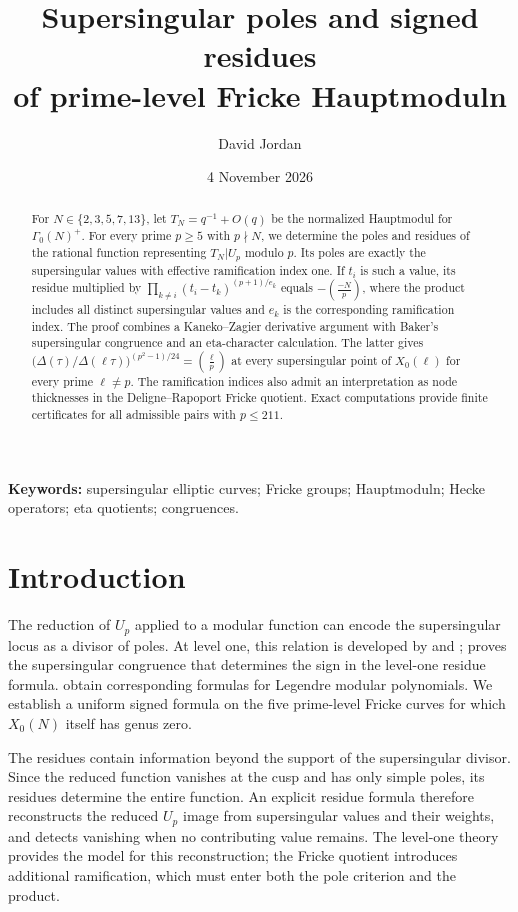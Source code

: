 \documentclass[11pt,a4paper]{article}
\title{Supersingular poles and signed residues\\of prime-level Fricke Hauptmoduln}
\author{David Jordan}
\date{4 November 2026}
\numberwithin{equation}{section}
\theoremstyle{definition}
\theoremstyle{remark}
\begin{document}
\maketitle
\begin{abstract}
For $N\in\{2,3,5,7,13\}$, let $T_N=q^{-1}+O(q)$ be the normalized Hauptmodul for
$\Gamma_0(N)^+$. For every prime $p\ge5$ with $p\nmid N$, we determine the poles and
residues of the rational function representing $T_N|U_p$ modulo $p$. Its poles are
exactly the supersingular values with effective ramification index one. If $t_i$ is
such a value, its residue multiplied by
$\prod_{k\ne i}(t_i-t_k)^{(p+1)/e_k}$ equals $-\left(\frac{-N}{p}\right)$, where the
product includes all distinct supersingular values and $e_k$ is the corresponding
ramification index. The proof combines a Kaneko--Zagier derivative argument with
Baker's supersingular congruence and an eta-character calculation. The latter gives
$\bigl(\Delta(\tau)/\Delta(\ell\tau)\bigr)^{(p^2-1)/24}=\left(\frac{\ell}{p}\right)$
at every supersingular point of $X_0(\ell)$ for every prime $\ell\ne p$.
The ramification indices also admit an interpretation as node thicknesses in the
Deligne--Rapoport Fricke quotient. Exact computations provide finite certificates
for all admissible pairs with $p\le211$.
\end{abstract}
\noindent\textbf{Keywords:} supersingular elliptic curves; Fricke groups; Hauptmoduln; Hecke operators; eta quotients; congruences.

\section{Introduction}\label{sec:intro}
The reduction of $U_p$ applied to a modular function can encode the supersingular
locus as a divisor of poles. At level one, this relation is developed by \citet{dS94} and \citet[\S10]{KZ98}; \citet{Baker98} proves the
supersingular congruence that determines the sign in the level-one residue formula.
\citet{BL18} obtain corresponding formulas for Legendre modular
polynomials. We establish a uniform signed formula on the five prime-level Fricke
curves for which $X_0(N)$ itself has genus zero.

The residues contain information beyond the support of the supersingular divisor.
Since the reduced function vanishes at the cusp and has only simple poles, its
residues determine the entire function. An explicit residue formula therefore
reconstructs the reduced $U_p$ image from supersingular values and their weights,
and detects vanishing when no contributing value remains. The level-one theory
provides the model for this reconstruction; the Fricke quotient introduces
additional ramification, which must enter both the pole criterion and the product.
\end{document}
